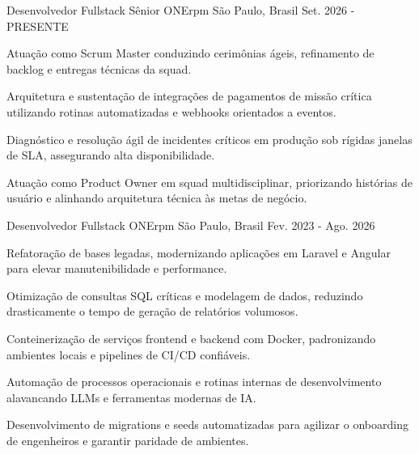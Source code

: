 

\begin{cventries}

  \cventry
    {Desenvolvedor Fullstack Sênior} %
    {ONErpm} %
    {São Paulo, Brasil} %
    {Set. 2026 - PRESENTE} %
    {
      \begin{cvitems} %
        \item {Atuação como Scrum Master conduzindo cerimônias ágeis, refinamento de backlog e entregas técnicas da squad.}
        \item {Arquitetura e sustentação de integrações de pagamentos de missão crítica utilizando rotinas automatizadas e webhooks orientados a eventos.}
        \item {Diagnóstico e resolução ágil de incidentes críticos em produção sob rígidas janelas de SLA, assegurando alta disponibilidade.}
        \item {Atuação como Product Owner em squad multidisciplinar, priorizando histórias de usuário e alinhando arquitetura técnica às metas de negócio.}
      \end{cvitems}
    }

  \cventry
    {Desenvolvedor Fullstack} %
    {ONErpm} %
    {São Paulo, Brasil} %
    {Fev. 2023 - Ago. 2026} %
    {
      \begin{cvitems} %
        \item {Refatoração de bases legadas, modernizando aplicações em Laravel e Angular para elevar manutenibilidade e performance.}
        \item {Otimização de consultas SQL críticas e modelagem de dados, reduzindo drasticamente o tempo de geração de relatórios volumosos.}
        \item {Conteinerização de serviços frontend e backend com Docker, padronizando ambientes locais e pipelines de CI/CD confiáveis.}
        \item {Automação de processos operacionais e rotinas internas de desenvolvimento alavancando LLMs e ferramentas modernas de IA.}
        \item {Desenvolvimento de migrations e seeds automatizadas para agilizar o onboarding de engenheiros e garantir paridade de ambientes.}
      \end{cvitems}
    }


\end{cventries}
